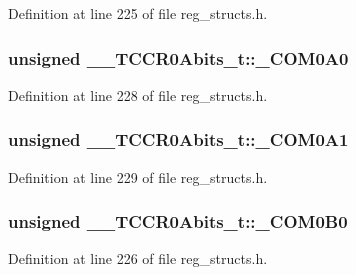 Definition at line 225 of file reg\+\_\+structs.\+h.

\hypertarget{union_____t_c_c_r0_abits__t_a3cfead9b848e04300829323d8645f6ee}{
\subsubsection[{\+\_\+\+C\+O\+M0\+A0}]{\setlength{\rightskip}{0pt plus 5cm}unsigned \+\_\+\+\_\+\+T\+C\+C\+R0\+Abits\+\_\+t\+::\+\_\+\+C\+O\+M0\+A0}}\label{union_____t_c_c_r0_abits__t_a3cfead9b848e04300829323d8645f6ee}


Definition at line 228 of file reg\+\_\+structs.\+h.

\hypertarget{union_____t_c_c_r0_abits__t_a67d9619cf1cebd1454b21ebfb15f4b37}{
\subsubsection[{\+\_\+\+C\+O\+M0\+A1}]{\setlength{\rightskip}{0pt plus 5cm}unsigned \+\_\+\+\_\+\+T\+C\+C\+R0\+Abits\+\_\+t\+::\+\_\+\+C\+O\+M0\+A1}}\label{union_____t_c_c_r0_abits__t_a67d9619cf1cebd1454b21ebfb15f4b37}


Definition at line 229 of file reg\+\_\+structs.\+h.

\hypertarget{union_____t_c_c_r0_abits__t_a71364693c2cfae1ff98fb26f7563d891}{
\subsubsection[{\+\_\+\+C\+O\+M0\+B0}]{\setlength{\rightskip}{0pt plus 5cm}unsigned \+\_\+\+\_\+\+T\+C\+C\+R0\+Abits\+\_\+t\+::\+\_\+\+C\+O\+M0\+B0}}\label{union_____t_c_c_r0_abits__t_a71364693c2cfae1ff98fb26f7563d891}


Definition at line 226 of file reg\+\_\+structs.\+h.

